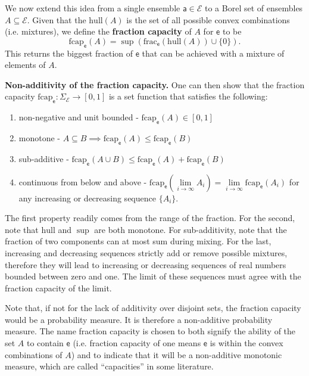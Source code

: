 \documentclass[10pt,twocolumn, nofootinbib]{revtex4-2}
\newcommand\hull{\mathrm{hull}}
\newcommand\fraction{\mathrm{frac}}
\newcommand\frcap{\mathrm{fcap}}
\newcommand{\ens}[1][e] {\mathsf{#1}} %
\newcommand{\Ens}[1][E] {\mathcal{#1}} %
\begin{document}
We now extend this idea from a single ensemble $\ens[a] \in \Ens$ to a Borel set of ensembles $A \subseteq \Ens$. Given that the $\hull(A)$ is the set of all possible convex combinations (i.e. mixtures), we define the \textbf{fraction capacity} of $A$ for $\ens$ to be
\begin{equation}
	\frcap_{\ens}(A) = \sup(\fraction_{\ens}(\hull(A))\cup\{0\}).
\end{equation}
This returns the biggest fraction of $\ens$ that can be achieved with a mixture of elements of $A$.

\textbf{Non-additivity of the fraction capacity.} One can then show that the fraction capacity $\frcap_{\ens} : \Sigma_{\Ens} \to [0,1]$ is a set function that satisfies the following:
\begin{enumerate}
	\item non-negative and unit bounded - $\frcap_{\ens}(A) \in [0,1]$
	\item monotone - $A \subseteq B \implies \frcap_{\ens}(A) \leq \frcap_{\ens}(B)$
	\item sub-additive - $\frcap_{\ens}(A \cup B) \leq \frcap_{\ens}(A) + \frcap_{\ens}(B)$
	\item continuous from below and above - $\frcap_{\ens}(\lim\limits_{i \to \infty} A_i) = \lim\limits_{i \to \infty} \frcap_{\ens}(A_i)$ for any increasing or decreasing sequence $\{A_i\}$.
\end{enumerate}

The first property readily comes from the range of the fraction. For the second, note that $\hull$ and $\sup$ are both monotone. For sub-additivity, note that the fraction of two components can at most sum during mixing. For the last, increasing and decreasing sequences strictly add or remove possible mixtures, therefore they will lead to increasing or decreasing sequences of real numbers bounded between zero and one. The limit of these sequences must agree with the fraction capacity of the limit.

Note that, if not for the lack of additivity over disjoint sets, the fraction capacity would be a probability measure. It is therefore a non-additive probability measure. The name fraction capacity is chosen to both signify the ability of the set $A$ to contain $\ens$ (i.e. fraction capacity of one means $\ens$ is within the convex combinations of $A$) and to indicate that it will be a non-additive monotonic measure, which are called ``capacities'' in some literature.\cite{nonadditive2014}
\end{document}
